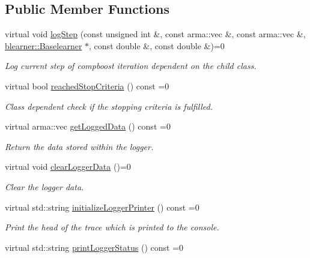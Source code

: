 \subsection*{Public Member Functions}
\begin{DoxyCompactItemize}
\item 
virtual void \mbox{\hyperlink{classlogger_1_1_logger_a91d987a86698e455b6fd3468f266d3fe}{log\+Step}} (const unsigned int \&, const arma\+::vec \&, const arma\+::vec \&, \mbox{\hyperlink{classblearner_1_1_baselearner}{blearner\+::\+Baselearner}} $\ast$, const double \&, const double \&)=0
\begin{DoxyCompactList}\small\item\em Log current step of compboost iteration dependent on the child class. \end{DoxyCompactList}\item 
virtual bool \mbox{\hyperlink{classlogger_1_1_logger_aed91421c07062b91cee158ef2bda7ae8}{reached\+Stop\+Criteria}} () const =0
\begin{DoxyCompactList}\small\item\em Class dependent check if the stopping criteria is fulfilled. \end{DoxyCompactList}\item 
virtual arma\+::vec \mbox{\hyperlink{classlogger_1_1_logger_aa4fc254c532172db3404b7c0bcd17092}{get\+Logged\+Data}} () const =0
\begin{DoxyCompactList}\small\item\em Return the data stored within the logger. \end{DoxyCompactList}\item 
virtual void \mbox{\hyperlink{classlogger_1_1_logger_a8c68db2430fa84b67528bfa6ae45a516}{clear\+Logger\+Data}} ()=0
\begin{DoxyCompactList}\small\item\em Clear the logger data. \end{DoxyCompactList}\item 
virtual std\+::string \mbox{\hyperlink{classlogger_1_1_logger_a825f96e8564ac4013ff09ef842c0aeec}{initialize\+Logger\+Printer}} () const =0
\begin{DoxyCompactList}\small\item\em Print the head of the trace which is printed to the console. \end{DoxyCompactList}\item 
virtual std\+::string \mbox{\hyperlink{classlogger_1_1_logger_abad818a7e8053ca84cb267e883b5e377}{print\+Logger\+Status}} () const =0

\end{DoxyCompactItemize}

